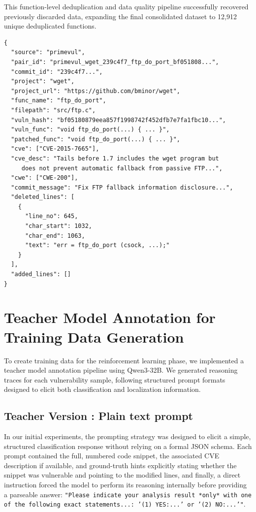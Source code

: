 \documentclass[12pt,a4paper]{article}
\makeatletter
\newcounter{TeacherVer}
\newcommand{\teacherversion}[2]{%
  \stepcounter{TeacherVer}%
  \subsection{Teacher Version \theTeacherVer: #1}%
  \protected@edef\@currentlabel{\theTeacherVer}\label{#2}%
}
\makeatother
\begin{document}
This function-level deduplication and data quality pipeline successfully recovered previously discarded data, expanding the final consolidated dataset to 12,912 unique deduplicated functions.

\begin{lstlisting}[caption={Example of the function-level deduplicated dataset entry structure}]
{
  "source": "primevul",
  "pair_id": "primevul_wget_239c4f7_ftp_do_port_bf051808...",
  "commit_id": "239c4f7...",
  "project": "wget",
  "project_url": "https://github.com/bminor/wget",
  "func_name": "ftp_do_port",
  "filepath": "src/ftp.c",
  "vuln_hash": "bf05180879eea857f1998742f452dfb7e7fa1fbc10...",
  "vuln_func": "void ftp_do_port(...) { ... }",
  "patched_func": "void ftp_do_port(...) { ... }",
  "cve": ["CVE-2015-7665"],
  "cve_desc": "Tails before 1.7 includes the wget program but 
     does not prevent automatic fallback from passive FTP...",
  "cwe": ["CWE-200"],
  "commit_message": "Fix FTP fallback information disclosure...",
  "deleted_lines": [
    {
      "line_no": 645, 
      "char_start": 1032, 
      "char_end": 1063, 
      "text": "err = ftp_do_port (csock, ...);"
    }
  ],
  "added_lines": []
}
\end{lstlisting}

\section{Teacher Model Annotation for Training Data Generation} \label{sec:teacher_model_annotation}

To create training data for the reinforcement learning phase, we implemented a teacher model annotation pipeline using Qwen3-32B. We generated reasoning traces for each vulnerability sample, following structured prompt formats designed to elicit both classification and localization information.

\teacherversion{Plain text prompt}{ver:teacher_sem2}
In our initial experiments, the prompting strategy was designed to elicit a simple, structured classification response without relying on a formal JSON schema. Each prompt contained the full, numbered code snippet, the associated CVE description if available, and ground-truth hints explicitly stating whether the snippet was vulnerable and pointing to the modified lines, and finally, a direct instruction forced the model to perform its reasoning internally before providing a parseable answer: \texttt{"Please indicate your analysis result *only* with one of the following exact statements...: '(1) YES:...' or '(2) NO:...'"}.
\end{document}
